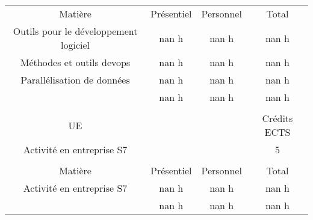 \begin{longtable}{c c c c}
Matière&Présentiel&Personnel&Total\\%
Outils pour le développement logiciel &nan h&nan h&nan h\\%
Méthodes et outils devops&nan h&nan h&nan h\\%
Parallélisation de données&nan h&nan h&nan h\\%
\hline%
&nan h&nan h&nan h\\%
\hline%
&&&\\%
UE&&&Crédits ECTS\\%
Activité en entreprise S7&&&5\\%
&&&\\%
Matière&Présentiel&Personnel&Total\\%
Activité en entreprise S7&nan h&nan h&nan h\\%
\hline%
&nan h&nan h&nan h\\%
\hline%
\end{longtable}